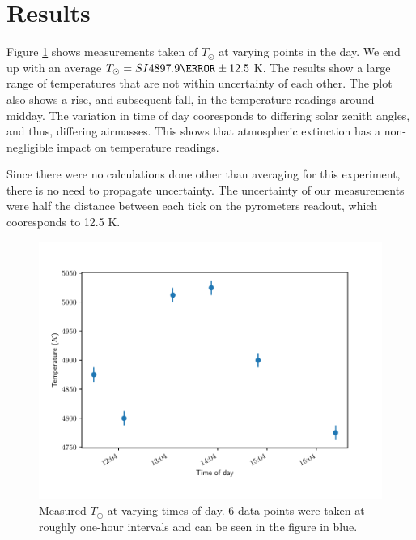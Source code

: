 \documentclass[%
 reprint,
 amsmath,amssymb,
 aps,
 10pt
]{revtex4-2}
\begin{document}
\section{Results}
Figure \ref{temps} shows measurements taken of $T_\odot$ at varying points in the day. We end up with an average $\bar{T}_\odot = SI{4897.9}{\kelvin} \pm 12.5$ K.
The results show a large range of temperatures that are not within uncertainty of each other. The plot also shows a rise, and subsequent fall, in the temperature readings around midday. The variation in time of day cooresponds to differing solar zenith angles, and thus, differing airmasses. This shows that atmospheric extinction has a non-negligible impact on temperature readings.
\par
Since there were no calculations done other than averaging for this experiment, there is no need to propagate uncertainty. The uncertainty of our measurements were half the distance between each tick on the pyrometers readout, which cooresponds to 12.5 K.  
\begin{figure}
	\includegraphics{../python/temps.pdf}
	\caption{\label{temps} Measured $T_\odot$ at varying times of day. 6 data points were taken at roughly one-hour intervals and can be seen in the figure in blue.}
\end{figure}
\end{document}
